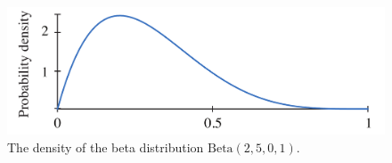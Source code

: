 \begin{figure}[t]
  \centering
  \includegraphics[width=1.0\columnwidth]{include/assets/beta.pdf}
  \caption{The density of the beta distribution $\text{Beta}(2, 5, 0, 1)$.}
\end{figure}
